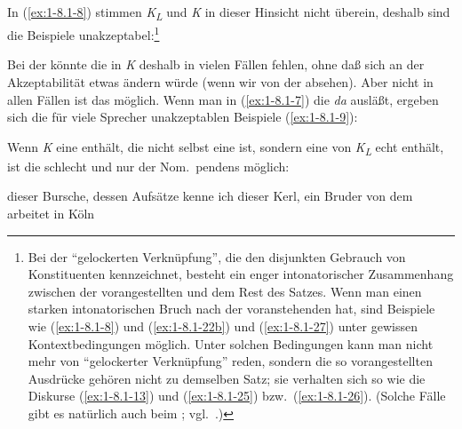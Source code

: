 \documentclass[output=paper]{langsci/langscibook}
\begin{document}
In (\ref{ex:1-8.1-8}) stimmen \textit{K\textsubscript{L}} und
\textit{K} in dieser Hinsicht nicht überein, deshalb sind die
Beispiele unakzeptabel:\footnote{%
	Bei der "`gelockerten Verknüpfung"',
  die den disjunkten Gebrauch von Konstituenten kennzeichnet, besteht
  ein enger intonatorischer Zusammenhang zwischen der vorangestellten
   und dem Rest des Satzes. Wenn man einen starken
  intonatorischen Bruch nach der voranstehenden  hat, sind
  Beispiele wie (\ref{ex:1-8.1-8}) und (\ref{ex:1-8.1-22b}) und
  (\ref{ex:1-8.1-27}) unter gewissen Kontextbedingungen möglich. Unter
  solchen Bedingungen kann man nicht mehr von "`gelockerter
  Verknüpfung"' reden, sondern die so vorangestellten Ausdrücke gehören
  nicht zu demselben Satz; sie verhalten sich so wie die Diskurse
  (\ref{ex:1-8.1-13}) und (\ref{ex:1-8.1-25})
  bzw.\ (\ref{ex:1-8.1-26}). (Solche Fälle gibt es natürlich auch beim
  ; vgl.\ \citet{Havers1926}.)%
}
\begin{exe}
\ex\label{ex:1-8.1-8}
\begin{xlist}
\end{xlist}
\end{exe}
 Bei der  könnte die  in \textit{K} deshalb in vielen Fällen fehlen, ohne daß sich an der Akzeptabilität etwas ändern würde (wenn wir von der  absehen). Aber nicht in allen Fällen ist das möglich. Wenn man in (\ref{ex:1-8.1-7}) die  \textit{da} ausläßt, ergeben sich die für viele Sprecher unakzeptablen Beispiele (\ref{ex:1-8.1-9}):
\begin{exe}
\ex\label{ex:1-8.1-9}
\begin{xlist}
\end{xlist}
\end{exe}
\largerpage
Wenn \textit{K} eine  enthält, die nicht selbst eine  ist, sondern
eine  von \textit{K\textsubscript{L}} echt enthält, ist die  schlecht und nur der
Nom.\ pendens möglich:
\begin{exe}
\ex\label{ex:1-8.1-10}
\begin{xlist}
\ex\label{ex:1-8.1-10i}
\begin{xlist}
\end{xlist}
\ex\label{ex:1-8.1-10ii}
\begin{xlist}
\ex\label{ex:1-8.1-10iia} dieser Bursche, dessen Aufsätze kenne ich
\ex\label{ex:1-8.1-10iib} dieser Kerl, ein Bruder von dem arbeitet in Köln
\end{xlist}
\end{xlist}
\end{exe}
\end{document}
